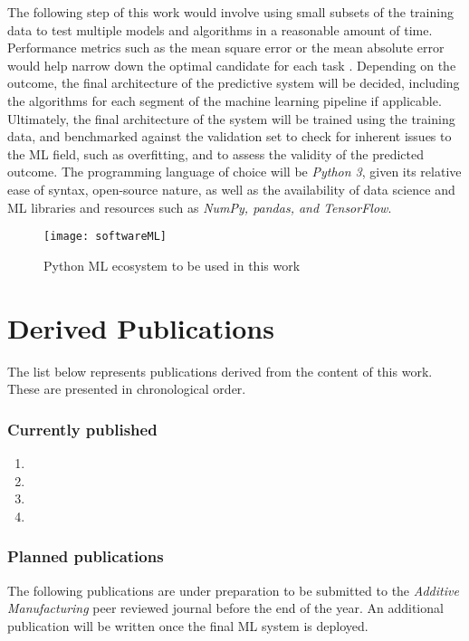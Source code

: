 \documentclass[main.tex]{subfiles}
\begin{document}
The following step of this work would involve using small subsets of the training data to test multiple models and algorithms in a reasonable amount of time. Performance metrics such as the mean square error or the mean absolute error would help narrow down the optimal candidate for each task \cite{Geron2019}. Depending on the outcome, the final architecture of the predictive system will be decided, including the algorithms for each segment of the machine learning pipeline if applicable. Ultimately, the final architecture of the system will be trained using the training data, and benchmarked against the validation set to check for inherent issues to the ML field, such as overfitting, and to assess the validity of the predicted outcome. The programming language of choice will be \emph{Python 3}, given its relative ease of syntax, open-source nature, as well as the availability of data science and ML libraries and resources such as \emph{NumPy, pandas, and TensorFlow}.

\begin{figure}[!htbp]
	\center
	\texttt{[image: softwareML]}
	\caption{Python ML ecosystem to be used in this work} \label{fig:python}
\end{figure} 

\section{Derived Publications}

The list below represents publications derived from the content of this work. These are presented in chronological order.

\subsubsection{Currently published}
\begin{enumerate}
	\item {}
	\item {}
	\item {}
	\item {}
\end{enumerate}

\subsubsection{Planned publications}

The following publications are under preparation to be submitted to the \emph{Additive Manufacturing} peer reviewed journal before the end of the year. An additional publication will be written once the final ML system is deployed.
\end{document}
